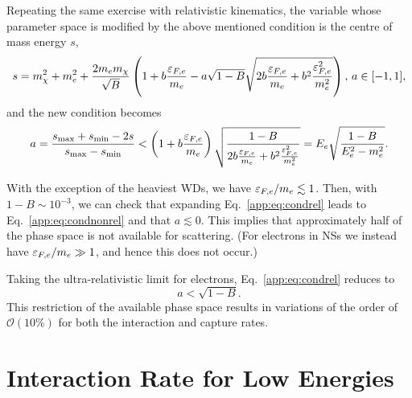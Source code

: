 Repeating the same exercise with relativistic kinematics, 
the variable whose parameter space is modified by the above mentioned condition is the centre of mass energy $s$,
\begin{equation}
s = m_\chi^2+m_e^2+\frac{2m_em_\chi}{\sqrt{B}}\left(1+b\frac{\varepsilon_{F,e}}{m_e}-a\sqrt{1-B}\sqrt{2b\frac{\varepsilon_{F,e}}{m_e}+b^2\frac{\varepsilon_{F,e}^2}{m_e^2}}\right), \,  a\in[-1,1], 
\end{equation}
and the new condition becomes
\begin{equation}
a= \frac{s_\mathrm{max}+s_\mathrm{min}-2s}{s_\mathrm{max}-s_\mathrm{min}} <\left(1+b\frac{\varepsilon_{F,e}}{m_e}\right)\sqrt{\frac{1-B}{2b\frac{\varepsilon_{F,e}}{m_e}+b^2\frac{\varepsilon_{F,e}^2}{m_e^2}}}
= E_e\sqrt{\frac{1-B}{E_e^2-m_e^2}}.\label{app:eq:condrel}
\end{equation}


With the exception of the heaviest WDs, we have $\varepsilon_{F,e}/m_e\lesssim 1$. Then, with $1-B\sim10^{-3}$, we can check that expanding Eq.~\ref{app:eq:condrel} leads to Eq.~\ref{app:eq:condnonrel} and that $a\lesssim 0$.
This implies that approximately half of the phase space is not available for scattering. (For electrons in NSs we instead have $\varepsilon_{F,e}/m_e\gg1$, and hence this does not occur.) 

Taking the ultra-relativistic limit for electrons, Eq.~\ref{app:eq:condrel} reduces to
\begin{equation}
a <\sqrt{1-B}\label{app:eq:condurel}.
\end{equation}
This restriction of the available phase space results in variations of the order of $\mathcal{O}(10\%)$ for both the interaction and capture rates.

\section{Interaction Rate for Low Energies}


